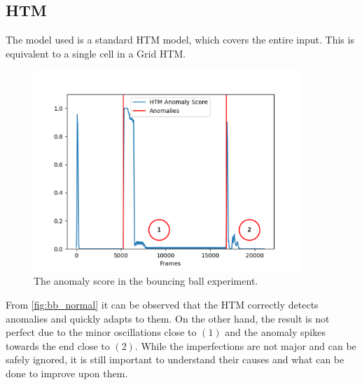 \subsection{HTM}
The model used is a standard HTM model, which covers the entire input. This is equivalent to a single cell in a Grid HTM.
\begin{figure}[H]
    \centering
    \includegraphics[width=0.9\textwidth]{resources/experiments/bouncing_ball/bb_anoms_bad.png}
    \caption[Bouncing Ball Experiment Anomaly Score]{The anomaly score in the bouncing ball experiment.}
    \label{fig:bb_normal}
\end{figure}
From \autoref{fig:bb_normal} it can be observed that the HTM correctly detects anomalies and quickly adapts to them. On the other hand, the result is not perfect due to the minor oscillations close to $(1)$ and the anomaly spikes towards the end close to $(2)$. While the imperfections are not major and can be safely ignored, it is still important to understand their causes and what can be done to improve upon them. \par
